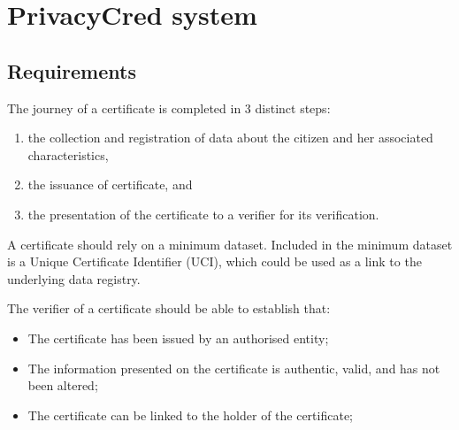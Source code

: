 \documentclass[a4paper,12pt,english]{sphinxhowto}
\begin{document}
\section{PrivacyCred system}
\label{\detokenize{ssi/privacycred:privacycred-system}}\label{\detokenize{ssi/privacycred::doc}}

\subsection{Requirements}
\label{\detokenize{ssi/privacycred:requirements}}
\sphinxAtStartPar
The journey of a certificate is completed in 3 distinct steps:
\begin{enumerate}
%
\item {} 
\sphinxAtStartPar
the collection and registration of data about the citizen and her associated characteristics,

\item {} 
\sphinxAtStartPar
the issuance of certificate, and

\item {} 
\sphinxAtStartPar
the presentation of the certificate to a verifier for its verification.

\end{enumerate}

\sphinxAtStartPar
A certificate should rely on a minimum dataset. Included in the minimum dataset is a Unique Certificate Identifier (UCI), which could be used as a link to the underlying data registry.

\sphinxAtStartPar
The verifier of a certificate should be able to establish that:
\begin{itemize}
\item {} 
\sphinxAtStartPar
The certificate has been issued by an authorised entity;

\item {} 
\sphinxAtStartPar
The information presented on the certificate is authentic, valid, and has not been altered;

\item {} 
\sphinxAtStartPar
The certificate can be linked to the holder of the certificate;

\end{itemize}
\end{document}
